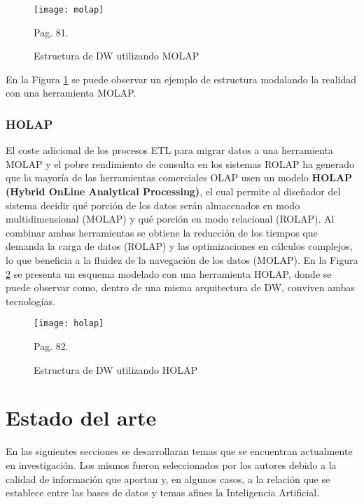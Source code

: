 \documentclass[a4paper,11pt]{article}
\begin{document}
\begin{flushleft}
    \begin{figure}
      \begin{center}
        \texttt{[image: molap]}
        \caption{Estructura de DW utilizando MOLAP} \cite{nagabhushana} Pag. 81.
        \label{molap}
      \end{center}
    \end{figure}
    
    En la Figura \ref{molap} se puede observar un ejemplo de estructura modalando la realidad con una herramienta MOLAP.
    
    \subsubsection{HOLAP}

    El coste adicional de los procesos ETL para migrar datos a una herramienta MOLAP y el pobre rendimiento de consulta en los sistemas ROLAP ha generado que la
    mayoría de las herramientas comerciales OLAP usen un modelo \textbf{HOLAP (Hybrid OnLine Analytical Processing)}, el cual permite al diseñador del sistema
    decidir qué porción de los datos serán almacenados en modo multidimensional (MOLAP) y qué porción en modo relacional (ROLAP). Al combinar ambas herramientas
    se obtiene la reducción de los tiempos que demanda la carga de datos (ROLAP) y las optimizaciones en cálculos complejos, lo que beneficia a la fluidez de la
    navegación de los datos (MOLAP). En la Figura \ref{holap} se presenta un esquema modelado con una herramienta HOLAP, donde se puede observar como, dentro de
    una misma arquitectura de DW, conviven ambas tecnologías.
    
    \begin{figure}
      \begin{center}
        \texttt{[image: holap]}
        \caption{Estructura de DW utilizando HOLAP} \cite{nagabhushana} Pag. 82.
        \label{holap}
      \end{center}
    \end{figure}
    
    
    
    \section{Estado del arte}
    
    En las siguientes secciones se desarrollaran temas que se encuentran actualmente en investigación. Los mismos fueron seleccionados por los autores
    debido a la calidad de información que aportan y, en algunos casos, a la relación que se establece entre las bases de datos y temas afines la
    Inteligencia Artificial.
    

\end{flushleft}
\end{document}
